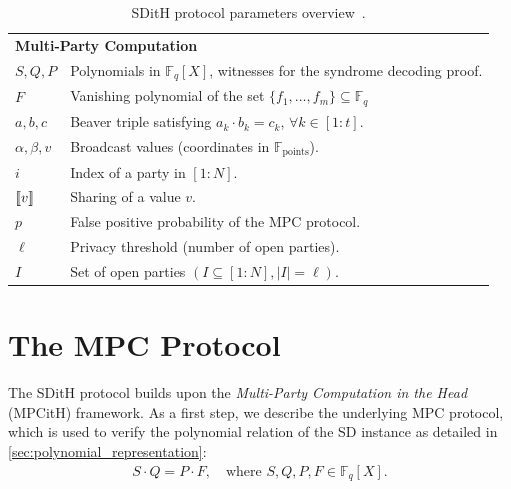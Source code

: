 \documentclass[11pt]{report}
\theoremstyle{definition}
\theoremstyle{plain}
\begin{document}
\begin{table}[]
\begin{tabular}{p{}p{}}
    \multicolumn{2}{l}{\textbf{Multi-Party Computation}}                                                                                  \\
    $S, Q, P$                    & Polynomials in $\mathbb{F}_q[X]$, witnesses for the syndrome decoding proof.                           \\
    $F$                          & Vanishing polynomial of the set $\{f_1, \ldots, f_m\} \subseteq \mathbb{F}_q$                          \\
    $a, b, c$                    & Beaver triple satisfying $a_k \cdot b_k = c_k$, $\forall k \in [1 : t]$.                               \\
    $\alpha, \beta, v$           & Broadcast values (coordinates in $\mathbb{F}_{\text{points}}$).                                        \\
    $i$                          & Index of a party in $[1 : N]$.                                                                         \\
    $\llbracket v \rrbracket$                     & Sharing of a value $v$.                                                                                \\
    $p$                          & False positive probability of the MPC protocol.                                                        \\
    $\ell$                       & Privacy threshold (number of open parties).                                                            \\
    $I$                          & Set of open parties $(I \subseteq [1 : N], |I| = \ell)$.                                               \\
  \end{tabular}
  \caption{SDitH protocol parameters overview~\cite[Table 1]{aguilarsyndrome11}.}\label{tab:sdith-protocol-parameters}
\end{table}

\section{The MPC Protocol}\label{sec:sdith-mpc}

The SDitH protocol builds upon the \textit{Multi-Party Computation in the Head} (MPCitH) framework. As a first step, we describe the underlying MPC protocol, which is used to verify the polynomial relation of the SD instance as detailed in \autoref{sec:polynomial_representation}:
\begin{align*}
  S \cdot Q = P \cdot F, \quad \text{where } S, Q, P, F \in \mathbb{F}_q[X].
\end{align*}
\end{document}
